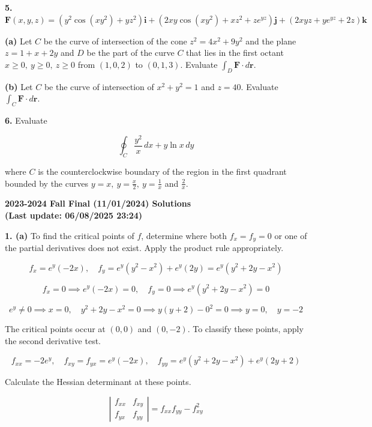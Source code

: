 \documentclass{article}
\begin{document}
\textbf{5.} $\mathbf{F}(x,y,z)=\left(y^2\cos\left(xy^2\right)+yz^2\right)\mathbf{i}+\left(2xy\cos\left(xy^2\right)+xz^2+z{e}^{yz}\right)\mathbf{j}+\left(2xyz+y{e}^{yz}+2z\right)\mathbf{k}$

\textbf{(a)} Let $C $ be the curve of intersection of the cone $z^2=4x^2+9y^2$ and the plane $z=1+x+2y$ and $D$ be the part of the curve $C$ that lies in the first octant $x\geq0,\:y\geq0,\:z\geq0$ from $(1,0,2)$ to $(0,1,3)$. Evaluate $\int_D\mathbf{F}\cdot d\mathbf{r}$.

\textbf{(b)} Let $C$ be the curve of intersection of $x^2+y^2=1$ and $z=40$. Evaluate $\int_C\mathbf{F}\cdot d\mathbf{r}$.

\vspace{1em}

\textbf{6.} Evaluate

\[\oint_C\frac{y^2}x\,dx+y\ln x\,dy\]

where $C$ is the counterclockwise boundary of the region in the first quadrant bounded by the curves $\displaystyle y=x,\:y=\frac x2,\:y=\frac1x$ and $\displaystyle\frac2x$.

\newpage

\begin{center}
\textbf{2023-2024 Fall Final (11/01/2024) Solutions\\
(Last update: 06/08/2025 23:24)}
\end{center}

\textbf{1. (a)} To find the critical points of $f$, determine where both $f_x=f_y=0$ or one of the partial derivatives does not exist. Apply the product rule appropriately.

\[f_x={e}^y(-2x),\quad f_y={e}^y\left(y^2-x^2\right)+{e}^y(2y)={e}^y\left(y^2+2y-x^2\right)\]

\[f_x=0\implies {e}^y(-2x) = 0,\quad f_y=0\implies{e}^y\left(y^2+2y-x^2\right)=0\]

\[{e}^y\neq0\implies x=0,\quad y^2+2y-x^2=0\implies y(y+2)-0^2=0\implies y=0,\quad y=-2\]

The critical points occur at $(0,0)$ and $(0,-2)$. To classify these points, apply the second derivative test.

\[f_{xx}=-2{e}^y,\quad f_{xy}=f_{yx}={e}^y(-2x),\quad f_{yy}={e}^y(y^2+2y-x^2)+{e}^y\left(2y+2\right)\]

Calculate the Hessian determinant at these points.

\[\left|\begin{array}{cc}
f_{xx}&f_{xy}\\
f_{yx}&f_{yy}
\end{array}\right|=f_{xx}f_{yy}-f_{xy}^2\]
\end{document}
